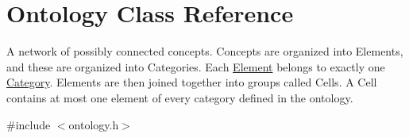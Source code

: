 \hypertarget{class_ontology}{\section{\-Ontology \-Class \-Reference}
\label{class_ontology}
}


\-A network of possibly connected concepts. \-Concepts are organized into \-Elements, and these are organized into \-Categories. \-Each \hyperlink{class_element}{\-Element} belongs to exactly one \hyperlink{class_category}{\-Category}. \-Elements are then joined together into groups called \-Cells. \-A \-Cell contains at most one element of every category defined in the ontology.  




{\ttfamily \#include $<$ontology.\-h$>$}

